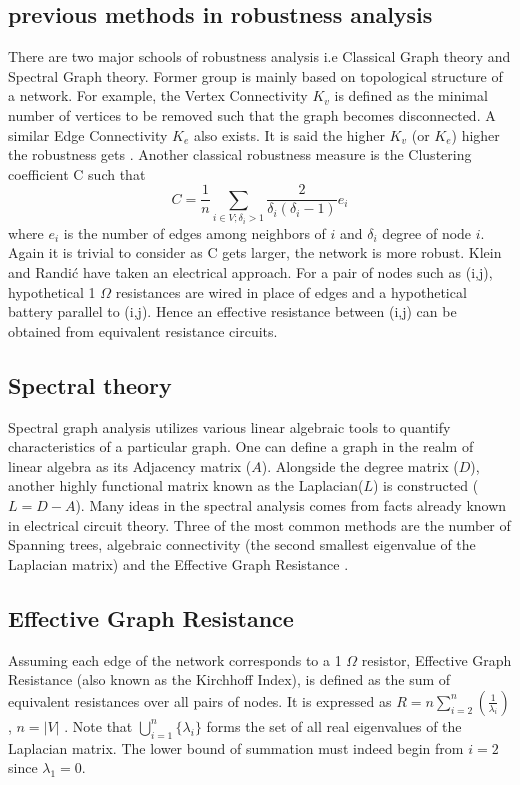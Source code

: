 \documentclass{article}
\begin{document}
	\subsection{previous methods in robustness analysis}
	There are two major schools of robustness analysis i.e Classical Graph theory and Spectral Graph theory. Former group is mainly based on topological structure of a network. For example, the Vertex Connectivity $K_v$ is defined as the minimal number of vertices to be removed such that the graph becomes disconnected. A similar Edge Connectivity $K_e$ also exists. It is said the higher $K_v$ (or $K_e$) higher the robustness gets \cite{ellens2013graph}. Another classical robustness measure is the Clustering coefficient \cite{watts1998collective} C such that
	\begin{equation}
		C = \frac{1}{n} \sum_{i\in V;\delta_i>1}\frac{2}{\delta_i(\delta_i -1)}e_i
	\end{equation}
	where $e_i$ is the number of edges among neighbors of $i$ and $\delta_i$ degree of node $i$. Again it is trivial to consider as C gets larger, the network is more robust.
	Klein and Randi\'{c} \cite{klein1993m} have taken an electrical approach. For a pair of nodes such as (i,j), hypothetical 1 $\Omega$ resistances are wired in place of edges and a hypothetical battery parallel to (i,j). Hence an effective resistance between (i,j) can be obtained from equivalent resistance circuits.
	
	\subsection{Spectral theory}
	Spectral graph analysis utilizes various linear algebraic tools	to quantify characteristics of a particular graph. One can define a graph in the realm of linear algebra as its Adjacency matrix ($A$). Alongside the degree matrix ($D$), another highly functional matrix known as the Laplacian($L$) is constructed ($L=D-A$). Many ideas in the spectral analysis comes from facts already known in electrical circuit theory. Three of the most common methods are the number of Spanning trees, algebraic connectivity (the second smallest eigenvalue of the Laplacian matrix) and the Effective Graph Resistance \cite{ellens2013graph}.
	
	\subsection{Effective Graph Resistance}
	Assuming each edge of the network corresponds to a 1 $\Omega$ resistor, Effective Graph Resistance (also known as the Kirchhoff Index), is defined as the sum of equivalent resistances over all pairs of nodes. It is expressed as
	$R = n \sum_{i=2}^{n}(\frac{1}{\lambda_{i}})$, $n = |V|$ \cite{klein1993m}\cite{yamashita2021effective}. Note that $\bigcup_{i=1}^{n} \{\lambda_i\}$ forms the set of all real eigenvalues of the Laplacian matrix. The lower bound of summation must indeed begin from $i=2$ since $\lambda_1 = 0$.
	
\end{document}
